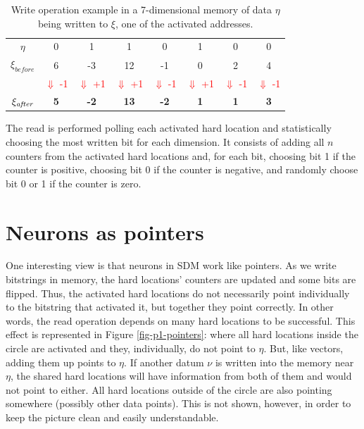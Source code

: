 \begin{table}
\begin{tabular}{c|c|c|c|c|c|c|c|}
\cline{2-8}
$\eta$ & 0 & 1 & 1 & 0 & 1 & 0 & 0\tabularnewline
\cline{2-8}
$\xi_{\textit{before}}$ & 6 & -3 & 12 & -1 & 0 & 2 & 4\tabularnewline
\cline{2-8}
\multicolumn{1}{c}{} & \multicolumn{1}{c}{\textcolor{red}{\small{}$\Downarrow$ -1}} & \multicolumn{1}{c}{\textcolor{red}{\small{}$\Downarrow$ +1}} & \multicolumn{1}{c}{\textcolor{red}{\small{}$\Downarrow$ +1}} & \multicolumn{1}{c}{\textcolor{red}{\small{}$\Downarrow$ -1}} & \multicolumn{1}{c}{\textcolor{red}{\small{}$\Downarrow$ +1}} & \multicolumn{1}{c}{\textcolor{red}{\small{}$\Downarrow$ -1}} & \multicolumn{1}{c}{\textcolor{red}{\small{}$\Downarrow$ -1}}\tabularnewline
\cline{2-8}
$\xi_{\textit{\textit{after}}}$ & \textbf{5} & \textbf{-2} & \textbf{13} & \textbf{-2} & \textbf{1} & \textbf{1} & \textbf{3}\tabularnewline
\cline{2-8}
\end{tabular}

\caption{Write operation example in a 7-dimensional memory of data $\eta$
being written to $\xi$, one of the activated addresses.\label{tab:write operation}}


\end{table}


The read is performed polling each activated hard location and statistically choosing the most written bit for each dimension. It consists of adding all $n$ counters from the activated hard locations and, for each bit, choosing bit 1 if the counter is positive, choosing bit 0 if the counter is negative, and randomly choose bit 0 or 1 if the counter is zero.


\section{Neurons as pointers}

One interesting view is that neurons in SDM work like pointers. As we write bitstrings in memory, the hard locations' counters are updated and some bits are flipped. Thus, the activated hard locations do not necessarily point individually to the bitstring that activated it, but together they point correctly. In other words, the read operation depends on many hard locations to be successful. This effect is represented in Figure \ref{fig-p1-pointers}: where all hard locations inside the circle are activated and they, individually, do not point to $\eta$.  But, like vectors, adding them up points to $\eta$. If another datum $\nu$ is written into the memory near $\eta$, the shared hard locations will have information from both of them and would not point to either.  All hard locations outside of the circle are also pointing somewhere (possibly other data points). This is not shown, however, in order to keep the picture clean and easily understandable.

